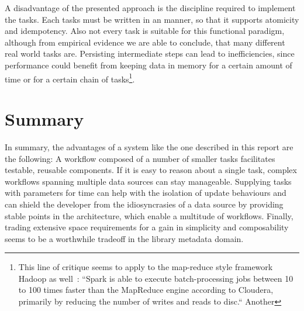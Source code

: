 \documentclass[english]{lni}
\begin{document}
A disadvantage of the presented approach is the discipline required to
implement the tasks. Each tasks must be written in an manner, so that it
supports atomicity and idempotency. Also not every task is suitable for
this functional paradigm, although from empirical evidence we are able
to conclude, that many different real world tasks are. Persisting intermediate steps can lead to inefficiencies, since
performance could benefit from keeping data in memory for a certain
amount of time or for a certain chain of tasks\footnote{This line of
critique seems to apply to the map-reduce style framework Hadoop as well~\cite{spark2014}: ``Spark is able to execute batch-processing jobs between 10 to 100 times faster than the MapReduce engine according to Cloudera, primarily by reducing the number of writes and reads to disc.``
Another }.

\section{Summary}
\label{summary}

In summary, the advantages of a system like the one described in this
report are the following: A workflow composed of a number of smaller tasks
facilitates testable, reusable components. If it is easy to reason
about a single task, complex workflows spanning multiple data sources
can stay manageable. Supplying tasks with parameters for time can help with the isolation
of update behaviours and can shield the developer from the idiosyncrasies of a data source
by providing stable points in the architecture, which enable a multitude
of workflows. Finally, trading extensive space requirements for a gain in
simplicity and composability seems to be a worthwhile tradeoff in the library metadata domain.


\end{document}
